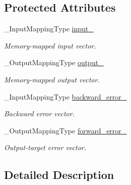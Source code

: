 \subsection*{Protected Attributes}
\begin{DoxyCompactItemize}
\item 
\-\_\-\-Input\-Mapping\-Type \hyperlink{classffnn_1_1layer_1_1_hidden_aec535cd632fce55d43fc91b04b95c836}{input\-\_\-}
\begin{DoxyCompactList}\small\item\em Memory-\/mapped input vector. \end{DoxyCompactList}\item 
\-\_\-\-Output\-Mapping\-Type \hyperlink{classffnn_1_1layer_1_1_hidden_a69245e9b3e1e9728ab12c69abf142bab}{output\-\_\-}
\begin{DoxyCompactList}\small\item\em Memory-\/mapped output vector. \end{DoxyCompactList}\item 
\-\_\-\-Input\-Mapping\-Type \hyperlink{classffnn_1_1layer_1_1_hidden_a4d615b2812b0c170e213a0b946d41e91}{backward\-\_\-error\-\_\-}
\begin{DoxyCompactList}\small\item\em Backward error vector. \end{DoxyCompactList}\item 
\-\_\-\-Output\-Mapping\-Type \hyperlink{classffnn_1_1layer_1_1_hidden_ae1671dbf7f91d9ae21d307761c0e930e}{forward\-\_\-error\-\_\-}
\begin{DoxyCompactList}\small\item\em Output-\/target error vector. \end{DoxyCompactList}\end{DoxyCompactItemize}


\subsection{Detailed Description}
